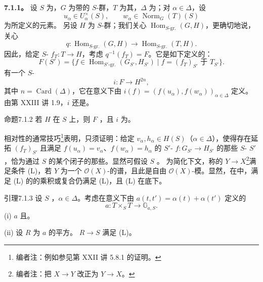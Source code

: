 \textbf{7.1.1。} 设 $S$ 为，$G$ 为带的 $S$-群，$T$ 为其，$\Delta$ 为；对 $\alpha\in\Delta$，设
\[u_\alpha\in U_\alpha^\times(S),\qquad w_\alpha\in\operatorname{Norm}_G(T)(S)\]
为所定义的元素。
另设 $H$ 为 $S$-群；我们关心 $\operatorname{Hom}_{S\text{-gr.}}(G,H)$，更确切地说，关心
\[q:\operatorname{Hom}_{S\text{-gr.}}(G,H)\longrightarrow\operatorname{Hom}_{S\text{-gr.}}(T,H).\]
因此，给定 $S$- $f_T:T\to H$，考虑 $q^{-1}(f_T)=F$。它是如下定义的：
\[F(S')=\{f\in\operatorname{Hom}_{S'\text{-gr.}}(G_{S'},H_{S'})\mid f=(f_T)_{S'}\text{ 于 }T_{S'}\}.\]
有一个 $S$-
\[i:F\longrightarrow H^{2n},\]
其中 $n=\operatorname{Card}(\Delta)$，它在意义下由 $i(f)=(f(u_\alpha),f(w_\alpha))_{\alpha\in\Delta}$ 定义。由第 XXIII 讲 1.9，$i$ 还是。
\begin{SGAresult}{命题}{7.1.2}
若 $H$ 在 $S$ 上，则 $F$ ，且 $i$ 为。
\end{SGAresult}
相对性的通常技巧\footnote{编者注：例如参见第 XXII 讲 5.8.1 的证明。}表明，只须证明：给定 $v_\alpha,h_\alpha\in H(S)$（$\alpha\in\Delta$），使得存在延拓 $(f_T)_{S'}$ 且满足 $f(u_\alpha)=v_\alpha$、$f(w_\alpha)=h_\alpha$ 的 $S'$- $f:G_{S'}\to H_{S'}$ 的那些 $S$- $S'$，恰为通过 $S$ 的某个闭子的那些。显然可假设 $S$ 。
为简化下文，称的 $Y\to X$\footnote{编者注：把 $X\to Y$ 改正为 $Y\to X$。}满足条件 (L)，若 $Y$ 为一个 $\mathscr O(X)$-的谱，且此是自由 $\mathscr O(X)$-模。显然，在中，满足 (L) 的的乘积或复合仍满足 (L)，且 (L) 在底下。
\begin{SGAresult}{引理}{7.1.3}
设 $S$ ，$\alpha\in\Delta$。考虑在意义下由 $a(t,t')=\alpha(t)+\alpha(t')$ 定义的
\[a:T\times_ST\longrightarrow\mathbb G_{a,S}.\]
(i) $a$ 且。

(ii) 设 $R$ 为 $a$ 的平方。 $R\to S$ 满足 (L)。
\end{SGAresult}
